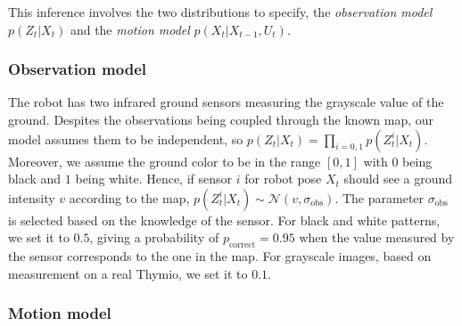 \documentclass[letterpaper, 10pt, conference]{ieeeconf}
\begin{document}
This inference involves the two distributions to specify, the \emph{observation model} $p(Z_t | X_t)$ and the \emph{motion model} $p(X_t|X_{t-1}, U_t)$.

\subsubsection{Observation model}

The robot has two infrared ground sensors measuring the grayscale value of the ground.
Despites the observations being coupled through the known map, our model assumes them to be independent, so $p(Z_t | X_t) = \prod_{i=0,1} p(Z_t^{i} | X_t)$.
Moreover, we assume the ground color to be in the range $[0,1]$ with $0$ being black and $1$ being white.
Hence, if sensor $i$ for robot pose $X_t$ should see a ground intensity $v$ according to the map, $p(Z_t^{i} | X_t) \sim \mathcal{N}(v,\sigma_\mathrm{obs})$.
The parameter $\sigma_\mathrm{obs}$ is selected based on the knowledge of the sensor.
For black and white patterns, we set it to $0.5$, giving a probability of $p_\mathrm{correct} = 0.95$ when the value measured by the sensor corresponds to the one in the map.
For grayscale images, based on measurement on a real Thymio, we set it to $0.1$.

\subsubsection{Motion model}
\end{document}

